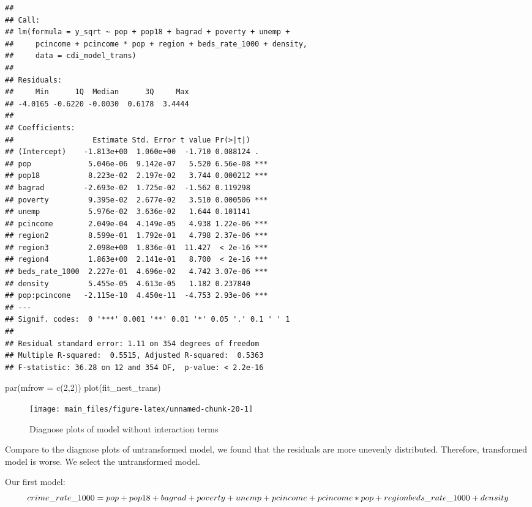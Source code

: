 \documentclass[
  11pt,
]{article}
\newenvironment{Shaded}{\begin{snugshade}}{\end{snugshade}}
\newcommand{\AttributeTok}[1]{\textcolor[rgb]{0.77,0.63,0.00}{#1}}
\newcommand{\DecValTok}[1]{\textcolor[rgb]{0.00,0.00,0.81}{#1}}
\newcommand{\FunctionTok}[1]{\textcolor[rgb]{0.00,0.00,0.00}{#1}}
\newcommand{\NormalTok}[1]{#1}
\begin{document}
\begin{verbatim}
## 
## Call:
## lm(formula = y_sqrt ~ pop + pop18 + bagrad + poverty + unemp + 
##     pcincome + pcincome * pop + region + beds_rate_1000 + density, 
##     data = cdi_model_trans)
## 
## Residuals:
##     Min      1Q  Median      3Q     Max 
## -4.0165 -0.6220 -0.0030  0.6178  3.4444 
## 
## Coefficients:
##                  Estimate Std. Error t value Pr(>|t|)    
## (Intercept)    -1.813e+00  1.060e+00  -1.710 0.088124 .  
## pop             5.046e-06  9.142e-07   5.520 6.56e-08 ***
## pop18           8.223e-02  2.197e-02   3.744 0.000212 ***
## bagrad         -2.693e-02  1.725e-02  -1.562 0.119298    
## poverty         9.395e-02  2.677e-02   3.510 0.000506 ***
## unemp           5.976e-02  3.636e-02   1.644 0.101141    
## pcincome        2.049e-04  4.149e-05   4.938 1.22e-06 ***
## region2         8.599e-01  1.792e-01   4.798 2.37e-06 ***
## region3         2.098e+00  1.836e-01  11.427  < 2e-16 ***
## region4         1.863e+00  2.141e-01   8.700  < 2e-16 ***
## beds_rate_1000  2.227e-01  4.696e-02   4.742 3.07e-06 ***
## density         5.455e-05  4.613e-05   1.182 0.237840    
## pop:pcincome   -2.115e-10  4.450e-11  -4.753 2.93e-06 ***
## ---
## Signif. codes:  0 '***' 0.001 '**' 0.01 '*' 0.05 '.' 0.1 ' ' 1
## 
## Residual standard error: 1.11 on 354 degrees of freedom
## Multiple R-squared:  0.5515, Adjusted R-squared:  0.5363 
## F-statistic: 36.28 on 12 and 354 DF,  p-value: < 2.2e-16
\end{verbatim}

\begin{Shaded}
\begin{Highlighting}[]
\FunctionTok{par}\NormalTok{(}\AttributeTok{mfrow =} \FunctionTok{c}\NormalTok{(}\DecValTok{2}\NormalTok{,}\DecValTok{2}\NormalTok{))}
\FunctionTok{plot}\NormalTok{(fit\_nest\_trans)}
\end{Highlighting}
\end{Shaded}

\begin{figure}
\texttt{[image: main\_files/figure-latex/unnamed-chunk-20-1]} \caption{\label{fig:figs}Diagnose plots of model without interaction terms}\label{fig:unnamed-chunk-20}
\end{figure}

Compare to the diagnose plots of untransformed model, we found that the
residuals are more unevenly distributed. Therefore, transformed model is
worse. We select the untransformed model.

Our first model: \[crime\_rate\_1000 = pop + pop18 + bagrad +
                  poverty + unemp \\ + pcincome + pcincome*pop + region
                  beds\_rate\_1000 + density\]
\end{document}
